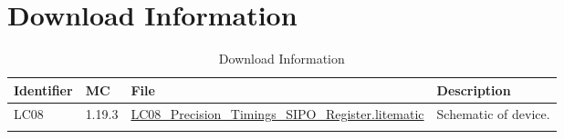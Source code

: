 \documentclass[10pt]{datasheet}
\begin{document}
\section{Download Information}
\begin{table}[h]
    \caption{Download Information}
    \begin{tabularx}{\textwidth}{l | l | l | X}
        \thickhline
        \textbf{Identifier} & \textbf{MC} & \textbf{File} & \textbf{Description} \\
        \hline
        LC08 & 1.19.3 & \href{https://github.com/Soontech-Annals/Archive/blob/b56572c0d2b4f182d9e9d41449d8cb2963b923ae/Archive/logic-and-computation/LC08\%20Precision\%20Timings\%20SIPO\%20Register/LC08\_Precision\_Timings\_SIPO\_Register.litematic?raw=1}{LC08\_Precision\_Timings\_SIPO\_Register.litematic} & Schematic of device. \\
        \hline
        \thickhline
    \end{tabularx}
\end{table}
\end{document}
